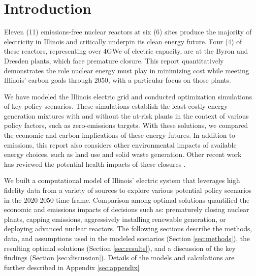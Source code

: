 \section{Introduction}\label{sec:intro}
Eleven (11) emissions-free nuclear reactors at six (6) sites produce the majority of
electricity in Illinois and critically underpin its clean energy future. Four 
(4) of these reactors, representing over 4GWe of electric capacity, are at the Byron 
and Dresden plants, which face premature closure. This
report quantitatively demonstrates the role nuclear energy must play in
minimizing cost while meeting Illinois’ carbon goals through 2050, with a 
particular focus on those plants. 

We have 
modeled the Illinois electric grid and conducted optimization simulations of 
key policy scenarios. These simulations establish the least costly energy 
generation mixtures with and without the at-risk plants in the context of 
various policy factors, such as zero-emissions targets. 
With these solutions, we compared the economic and carbon implications of these energy futures. 
In addition to emissions, this report also considers
other environmental impacts of available energy choices, such as land use and
solid waste generation. Other recent work has reviewed the potential health 
impacts of these closures \cite{catf_potential_2021}.

We built a computational model of Illinois' electric system that leverages high 
fidelity data from a variety of sources to explore various potential policy 
scenarios in the 2020-2050 time frame.  Comparison among optimal solutions 
quantified the economic and emissions impacts of decisions such as: prematurely closing nuclear 
plants, capping emissions, aggressively installing renewable generation, or 
deploying advanced nuclear reactors.  The following sections describe the 
methods, data, and assumptions used in the modeled scenarios (Section 
\ref{sec:methods}), the resulting optimal solutions (Section 
\ref{sec:results}), and a discussion of the key findings (Section 
\ref{sec:discussion}). Details of the models and calculations are further 
described in Appendix \ref{sec:appendix} 
